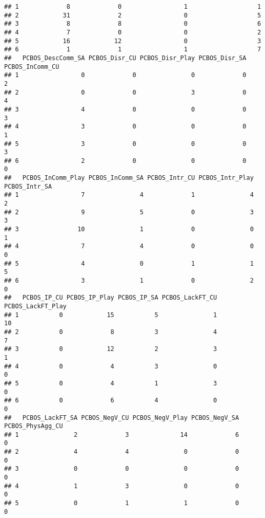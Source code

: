 \documentclass[
]{article}
\begin{document}
\begin{verbatim}
## 1             8             0                 1                   1
## 2            31             2                 0                   5
## 3             8             8                 0                   6
## 4             7             0                 0                   2
## 5            16            12                 0                   3
## 6             1             1                 1                   7
##   PCBOS_DescComm_SA PCBOS_Disr_CU PCBOS_Disr_Play PCBOS_Disr_SA PCBOS_InComm_CU
## 1                 0             0               0             0               2
## 2                 0             0               3             0               4
## 3                 4             0               0             0               3
## 4                 3             0               0             0               1
## 5                 3             0               0             0               3
## 6                 2             0               0             0               0
##   PCBOS_InComm_Play PCBOS_InComm_SA PCBOS_Intr_CU PCBOS_Intr_Play PCBOS_Intr_SA
## 1                 7               4             1               4             2
## 2                 9               5             0               3             3
## 3                10               1             0               0             1
## 4                 7               4             0               0             0
## 5                 4               0             1               1             5
## 6                 3               1             0               2             0
##   PCBOS_IP_CU PCBOS_IP_Play PCBOS_IP_SA PCBOS_LackFT_CU PCBOS_LackFT_Play
## 1           0            15           5               1                10
## 2           0             8           3               4                 7
## 3           0            12           2               3                 1
## 4           0             4           3               0                 0
## 5           0             4           1               3                 0
## 6           0             6           4               0                 0
##   PCBOS_LackFT_SA PCBOS_NegV_CU PCBOS_NegV_Play PCBOS_NegV_SA PCBOS_PhysAgg_CU
## 1               2             3              14             6                0
## 2               4             4               0             0                0
## 3               0             0               0             0                0
## 4               1             3               0             0                0
## 5               0             1               1             0                0

\end{verbatim}
\end{document}
